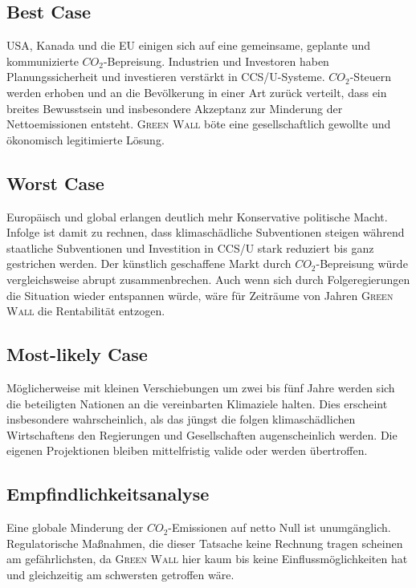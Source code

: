\subsection{Best Case}

USA, Kanada und die EU einigen sich auf eine gemeinsame, geplante und kommunizierte \(CO_2\)-Bepreisung.
Industrien und Investoren haben Planungssicherheit und investieren verstärkt in CCS/U-Systeme.
\(CO_2\)-Steuern werden erhoben und an die Bevölkerung in einer Art zurück verteilt, dass ein breites Bewusstsein und insbesondere Akzeptanz zur Minderung der Nettoemissionen entsteht.
\textsc{Green Wall} böte eine gesellschaftlich gewollte und ökonomisch legitimierte Lösung.

\subsection{Worst Case}

Europäisch und global erlangen deutlich mehr Konservative politische Macht.
Infolge ist damit zu rechnen, dass klimaschädliche Subventionen steigen während staatliche Subventionen und Investition in CCS/U stark reduziert bis ganz gestrichen werden.
Der künstlich geschaffene Markt durch \(CO_2\)-Bepreisung würde vergleichsweise abrupt zusammenbrechen.
Auch wenn sich durch Folgeregierungen die Situation wieder entspannen würde, wäre für Zeiträume von Jahren \textsc{Green Wall} die Rentabilität entzogen.

\subsection{Most-likely Case}

Möglicherweise mit kleinen Verschiebungen um zwei bis fünf Jahre werden sich die beteiligten Nationen an die vereinbarten Klimaziele halten.
Dies erscheint insbesondere wahrscheinlich, als das jüngst die folgen klimaschädlichen Wirtschaftens den Regierungen und Gesellschaften augenscheinlich werden.
Die eigenen Projektionen bleiben mittelfristig valide oder werden übertroffen.

\subsection{Empfindlichkeitsanalyse}

Eine globale Minderung der \(CO_2\)-Emissionen auf netto Null ist unumgänglich.
Regulatorische Maßnahmen, die dieser Tatsache keine Rechnung tragen scheinen am gefährlichsten, da \textsc{Green Wall} hier kaum bis keine Einflussmöglichkeiten hat und gleichzeitig am schwersten getroffen wäre.\par\medskip
%


